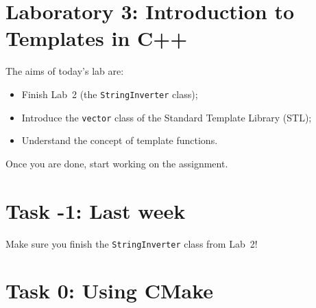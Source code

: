 
\section*{Laboratory 3: Introduction to Templates in C++}

%
%
%
%    
%    

The aims of today's lab are:
\begin{itemize}
\item Finish Lab~2 (the \verb+StringInverter+ class);
\item Introduce the \verb+vector+ class of the Standard Template Library (STL);
\item Understand the concept of template functions. 
\end{itemize}

Once you are done,  start working on the assignment.

\section*{Task -1: Last week}

Make sure you finish the \verb+StringInverter+ class from Lab~2!

\section*{Task 0: Using CMake}

